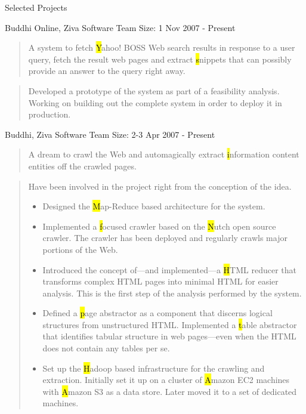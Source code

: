 \documentclass{resume}
\newcommand{\teamsize}{\hfill\sc\footnotesize Team Size: }
\begin{document}
\begin{category}{Selected Projects}{}

    \item {\topic Buddhi Online,} Ziva Software
        {\teamsize 1}
        {\period Nov 2007 - Present}
        \begin{quote}
            A system to fetch {\hl Yahoo! BOSS} Web search results in response
            to a user query, fetch the result web pages and extract {\hl
            snippets} that can possibly provide an answer to the query right
            away.
        \end{quote}
        \begin{quote}
            Developed a prototype of the system as part of a feasibility
            analysis. Working on building out the complete system in order to
            deploy it in production.
        \end{quote}

    \item {\topic Buddhi,} Ziva Software
        {\teamsize 2-3}
        {\period Apr 2007 - Present}
        \begin{quote}
            A dream to crawl the Web and automagically extract {\hl information
            content entities} off the crawled pages.
        \end{quote}
        \begin{quote}
            Have been involved in the project right from the conception of the idea.
            \begin{itemize}
                \item Designed the {\hl Map-Reduce} based architecture for the
                    system.
                \item Implemented a {\hl focused crawler} based on the {\hl
                    Nutch} open source crawler. The crawler has been deployed
                    and regularly crawls major portions of the Web.
                \item Introduced the concept of---and implemented---a {\hl
                    HTML reducer} that transforms complex HTML pages into
                    minimal HTML for easier analysis. This is the first step of
                    the analysis performed by the system.
                \item Defined a {\hl page abstractor} as a component that
                    discerns logical structures from unstructured HTML.
                    Implemented a {\hl table abstractor} that identifies
                    tabular structure in web pages---even when the HTML does
                    not contain any tables per se.
                \item Set up the {\hl Hadoop} based infrastructure for the
                    crawling and extraction. Initially set it up on a cluster
                    of {\hl Amazon EC2} machines with {\hl Amazon S3} as a data
                    store. Later moved it to a set of dedicated machines.
            \end{itemize}
        \end{quote}


\end{category}
\end{document}
